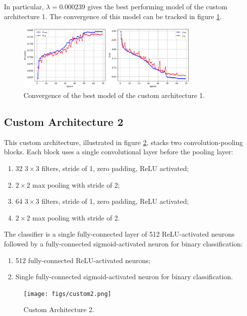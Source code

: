 In particular, $\lambda = 0.000239$ gives the best performing model of the custom architecture 1. The convergence of this model can be tracked in figure \ref{fig:custom1_best_training}.

\begin{figure}[ht]
    \centering
    \includegraphics[width=0.8\textwidth]{figs/custom1_best_training.png}
    \caption{Convergence of the best model of the custom architecture 1.}
    \label{fig:custom1_best_training}
\end{figure}

\subsection{Custom Architecture 2}

This custom architecture, illustrated in figure \ref{fig:custom2}, stacks two convolution-pooling blocks. Each block uses a single convolutional layer before the pooling layer:

\begin{enumerate}
    \item 32 $3 \times 3$ filters, stride of 1, zero padding, ReLU activated;
    \item $2 \times 2$ max pooling with stride of 2;
    \item 64 $3 \times 3$ filters, stride of 1, zero padding, ReLU activated;
    \item $2 \times 2$ max pooling with stride of 2.
\end{enumerate}

The classifier is a single fully-connected layer of 512 ReLU-activated neurons followed by a fully-connected sigmoid-activated neuron for binary classification:

\begin{enumerate}
    \item 512 fully-connected ReLU-activated neurons;
    \item Single fully-connected sigmoid-activated neuron for binary classification.
\end{enumerate}

\begin{figure}[ht]
    \centering
    \texttt{[image: figs/custom2.png]}
    \caption{Custom Architecture 2.}
    \label{fig:custom2}
\end{figure}

